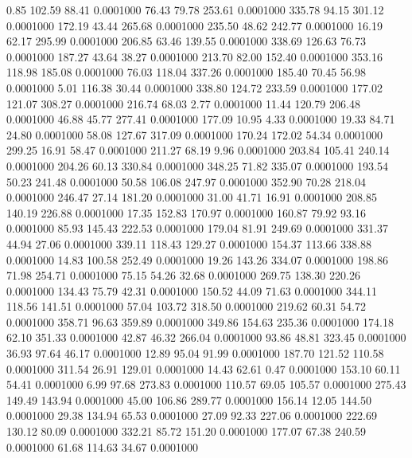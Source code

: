    0.85  102.59   88.41   0.0001000
  76.43   79.78  253.61   0.0001000
 335.78   94.15  301.12   0.0001000
 172.19   43.44  265.68   0.0001000
 235.50   48.62  242.77   0.0001000
  16.19   62.17  295.99   0.0001000
 206.85   63.46  139.55   0.0001000
 338.69  126.63   76.73   0.0001000
 187.27   43.64   38.27   0.0001000
 213.70   82.00  152.40   0.0001000
 353.16  118.98  185.08   0.0001000
  76.03  118.04  337.26   0.0001000
 185.40   70.45   56.98   0.0001000
   5.01  116.38   30.44   0.0001000
 338.80  124.72  233.59   0.0001000
 177.02  121.07  308.27   0.0001000
 216.74   68.03    2.77   0.0001000
  11.44  120.79  206.48   0.0001000
  46.88   45.77  277.41   0.0001000
 177.09   10.95    4.33   0.0001000
  19.33   84.71   24.80   0.0001000
  58.08  127.67  317.09   0.0001000
 170.24  172.02   54.34   0.0001000
 299.25   16.91   58.47   0.0001000
 211.27   68.19    9.96   0.0001000
 203.84  105.41  240.14   0.0001000
 204.26   60.13  330.84   0.0001000
 348.25   71.82  335.07   0.0001000
 193.54   50.23  241.48   0.0001000
  50.58  106.08  247.97   0.0001000
 352.90   70.28  218.04   0.0001000
 246.47   27.14  181.20   0.0001000
  31.00   41.71   16.91   0.0001000
 208.85  140.19  226.88   0.0001000
  17.35  152.83  170.97   0.0001000
 160.87   79.92   93.16   0.0001000
  85.93  145.43  222.53   0.0001000
 179.04   81.91  249.69   0.0001000
 331.37   44.94   27.06   0.0001000
 339.11  118.43  129.27   0.0001000
 154.37  113.66  338.88   0.0001000
  14.83  100.58  252.49   0.0001000
  19.26  143.26  334.07   0.0001000
 198.86   71.98  254.71   0.0001000
  75.15   54.26   32.68   0.0001000
 269.75  138.30  220.26   0.0001000
 134.43   75.79   42.31   0.0001000
 150.52   44.09   71.63   0.0001000
 344.11  118.56  141.51   0.0001000
  57.04  103.72  318.50   0.0001000
 219.62   60.31   54.72   0.0001000
 358.71   96.63  359.89   0.0001000
 349.86  154.63  235.36   0.0001000
 174.18   62.10  351.33   0.0001000
  42.87   46.32  266.04   0.0001000
  93.86   48.81  323.45   0.0001000
  36.93   97.64   46.17   0.0001000
  12.89   95.04   91.99   0.0001000
 187.70  121.52  110.58   0.0001000
 311.54   26.91  129.01   0.0001000
  14.43   62.61    0.47   0.0001000
 153.10   60.11   54.41   0.0001000
   6.99   97.68  273.83   0.0001000
 110.57   69.05  105.57   0.0001000
 275.43  149.49  143.94   0.0001000
  45.00  106.86  289.77   0.0001000
 156.14   12.05  144.50   0.0001000
  29.38  134.94   65.53   0.0001000
  27.09   92.33  227.06   0.0001000
 222.69  130.12   80.09   0.0001000
 332.21   85.72  151.20   0.0001000
 177.07   67.38  240.59   0.0001000
  61.68  114.63   34.67   0.0001000
